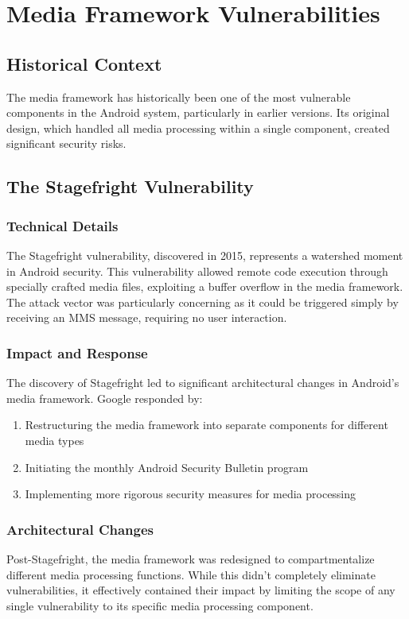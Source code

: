 \documentclass{article}
\begin{document}
\section{Media Framework Vulnerabilities}
\subsection{Historical Context}
The media framework has historically been one of the most vulnerable components in the Android system, particularly in earlier versions. Its original design, which handled all media processing within a single component, created significant security risks.

\subsection{The Stagefright Vulnerability}
\subsubsection{Technical Details}
The Stagefright vulnerability, discovered in 2015, represents a watershed moment in Android security. This vulnerability allowed remote code execution through specially crafted media files, exploiting a buffer overflow in the media framework. The attack vector was particularly concerning as it could be triggered simply by receiving an MMS message, requiring no user interaction.

\subsubsection{Impact and Response}
The discovery of Stagefright led to significant architectural changes in Android's media framework. Google responded by:
\begin{enumerate}
    \item Restructuring the media framework into separate components for different media types
    \item Initiating the monthly Android Security Bulletin program
    \item Implementing more rigorous security measures for media processing
\end{enumerate}

\subsubsection{Architectural Changes}
Post-Stagefright, the media framework was redesigned to compartmentalize different media processing functions. While this didn't completely eliminate vulnerabilities, it effectively contained their impact by limiting the scope of any single vulnerability to its specific media processing component.
\end{document}
